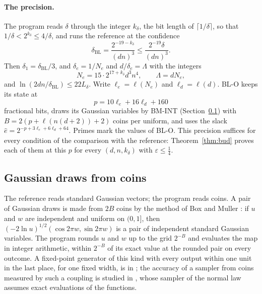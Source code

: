 \documentclass[11pt]{amsart}
\theoremstyle{definition}
\numberwithin{equation}{section}
\begin{document}
\paragraph{The precision.} The program reads $\delta$ through the integer $k_\delta$, the bit length of $\lceil1/\delta\rceil$, so that $1/\delta<2^{k_\delta}\le4/\delta$, and runs the reference at the confidence
\[
\delta_{\mathrm{BL}}=\frac{2^{-19-k_\delta}}{(dn)^3}\le\frac{2^{-19}\delta}{(dn)^3}.
\]
Then $\delta_1=\delta_{\mathrm{BL}}/3$, and $\delta_e=1/N_e$ and $d/\delta_e=\Lambda$ with the integers
\[
N_e=15\cdot2^{17+k_\delta}d^3n^4,\qquad\Lambda=dN_e ,
\]
and $\ln(2dn/\delta_{\mathrm{BL}})\le22L_\delta$.
Write $\ell_e=\ell(N_e)$ and $\ell_d=\ell(d)$. BL-O keeps its state at
\[
p=10\ell_e+16\ell_d+160
\]
fractional bits, draws its Gaussian variables by BM-INT (Section~\ref{sec:bit-gauss}) with $B=2(p+\ell(n(d+2))+2)$ coins per uniform, and uses the slack $\hat e=2^{-p+3\ell_e+6\ell_d+64}$. Primes mark the values of BL-O. This precision suffices for every condition of the comparison with the reference: Theorem~\ref{thm:bud} proves each of them at this $p$ for every $(d,n,k_\delta)$ with $\varepsilon\le\frac14$.

\subsection{Gaussian draws from coins}\label{sec:bit-gauss}

The reference reads standard Gaussian vectors; the program reads coins. A pair of Gaussian draws is made from $2B$ coins by the method of Box and Muller \cite{BM58}: if $u$ and $w$ are independent and uniform on $(0,1]$, then $(-2\ln u)^{1/2}(\cos2\pi w,\sin2\pi w)$ is a pair of independent standard Gaussian variables. The program rounds $u$ and $w$ up to the grid $2^{-B}$ and evaluates the map in integer arithmetic, within $2^{-B}$ of its exact value at the rounded pair on every outcome. A fixed-point generator of this kind with every output within one unit in the last place, for one fixed width, is in \cite[Section~3.3]{LVLL06}; the accuracy of a sampler from coins measured by such a coupling is studied in \cite{DG15}, whose sampler of the normal law assumes exact evaluations of the functions.
\end{document}
